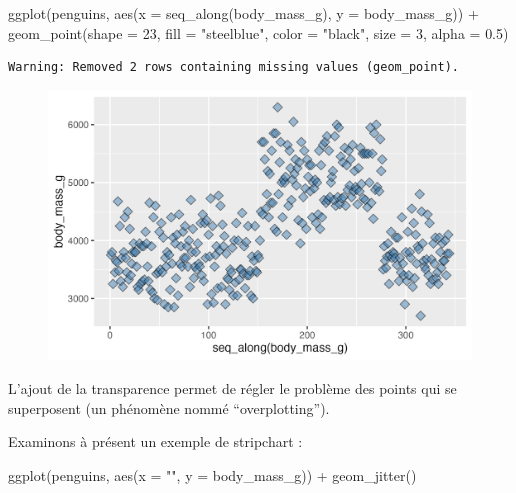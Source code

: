 \documentclass[
  letterpaper,
  DIV=11,
  numbers=noendperiod]{scrreprt}
\newenvironment{Shaded}{\begin{snugshade}}{\end{snugshade}}
\newcommand{\AttributeTok}[1]{\textcolor[rgb]{0.40,0.45,0.13}{#1}}
\newcommand{\DecValTok}[1]{\textcolor[rgb]{0.68,0.00,0.00}{#1}}
\newcommand{\FloatTok}[1]{\textcolor[rgb]{0.68,0.00,0.00}{#1}}
\newcommand{\FunctionTok}[1]{\textcolor[rgb]{0.28,0.35,0.67}{#1}}
\newcommand{\NormalTok}[1]{\textcolor[rgb]{0.00,0.23,0.31}{#1}}
\newcommand{\SpecialCharTok}[1]{\textcolor[rgb]{0.37,0.37,0.37}{#1}}
\newcommand{\StringTok}[1]{\textcolor[rgb]{0.13,0.47,0.30}{#1}}
\begin{document}
\begin{Shaded}
\begin{Highlighting}[]
\FunctionTok{ggplot}\NormalTok{(penguins, }\FunctionTok{aes}\NormalTok{(}\AttributeTok{x =} \FunctionTok{seq\_along}\NormalTok{(body\_mass\_g), }\AttributeTok{y =}\NormalTok{ body\_mass\_g)) }\SpecialCharTok{+}
  \FunctionTok{geom\_point}\NormalTok{(}\AttributeTok{shape =} \DecValTok{23}\NormalTok{, }\AttributeTok{fill =} \StringTok{"steelblue"}\NormalTok{, }\AttributeTok{color =} \StringTok{"black"}\NormalTok{, }
             \AttributeTok{size =} \DecValTok{3}\NormalTok{, }\AttributeTok{alpha =} \FloatTok{0.5}\NormalTok{)}
\end{Highlighting}
\end{Shaded}

\begin{verbatim}
Warning: Removed 2 rows containing missing values (geom_point).
\end{verbatim}

\begin{figure}[H]

{\centering \includegraphics{./03-visualization_files/figure-pdf/unnamed-chunk-28-1.png}

}

\end{figure}

L'ajout de la transparence permet de régler le problème des points qui
se superposent (un phénomène nommé ``overplotting'').

Examinons à présent un exemple de stripchart :

\begin{Shaded}
\begin{Highlighting}[]
\FunctionTok{ggplot}\NormalTok{(penguins, }\FunctionTok{aes}\NormalTok{(}\AttributeTok{x =} \StringTok{""}\NormalTok{, }\AttributeTok{y =}\NormalTok{ body\_mass\_g)) }\SpecialCharTok{+}
  \FunctionTok{geom\_jitter}\NormalTok{()}
\end{Highlighting}
\end{Shaded}
\end{document}
